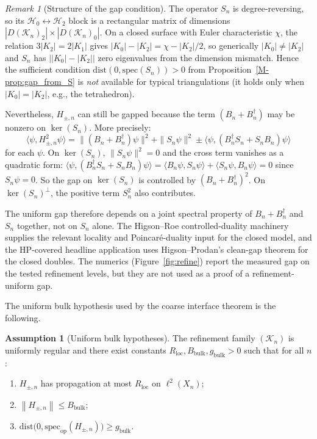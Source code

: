 \documentclass[11pt]{article}
\numberwithin{equation}{section}
\theoremstyle{definition}
\newtheorem{assumption}[theorem]{Assumption}
\theoremstyle{remark}
\newtheorem{remark}[theorem]{Remark}
\newcommand{\K}{\mathcal{K}}
\newcommand{\Hil}{\mathcal{H}}
\newcommand{\spec}{\mathrm{spec}}
\newcommand{\dist}{\mathrm{dist}}
\newcommand{\opnorm}[1]{\left\lVert#1\right\rVert}
\begin{document}
\begin{remark}[Structure of the gap condition]\label{rem:gap_structure}
The operator $S_n$ is degree-reversing, so its $\Hil_0\leftrightarrow\Hil_2$ block is a
rectangular matrix of dimensions $|D(\K_n)_2|\times|D(\K_n)_0|$. On a closed surface with Euler
characteristic $\chi$, the relation $3|K_2|=2|K_1|$ gives $|K_0|-|K_2|=\chi-|K_2|/2$, so
generically $|K_0|\neq|K_2|$ and $S_n$ has $\bigl||K_0|-|K_2|\bigr|$ zero eigenvalues from the
dimension mismatch. Hence the sufficient condition $\dist(0,\spec(S_n))>0$ from
Proposition~\ref{M-prop:gap_from_S} is \emph{not} available for typical triangulations (it holds only
when $|K_0|=|K_2|$, e.g., the tetrahedron).

Nevertheless, $H_{\pm,n}$ can still be gapped because the term $(B_n+B_n^\dagger)$ may be nonzero
on $\ker(S_n)$. More precisely:
\[
\langle\psi, H_{\pm,n}^2\psi\rangle
=
\|(B_n+B_n^\dagger)\psi\|^2+\|S_n\psi\|^2
\pm\langle\psi,(B_n^\dagger S_n+S_nB_n)\psi\rangle
\]
for each $\psi$. On $\ker(S_n)$, $\|S_n\psi\|^2=0$ and the cross term vanishes as a quadratic form:
$\langle\psi,(B_n^\dagger S_n+S_nB_n)\psi\rangle=\langle B_n\psi,S_n\psi\rangle+\langle
S_n\psi,B_n\psi\rangle=0$ since $S_n\psi=0$. So the gap on $\ker(S_n)$ is controlled by
$(B_n+B_n^\dagger)^2$. On $\ker(S_n)^\perp$, the positive term $S_n^2$ also contributes.

The uniform gap therefore depends on a joint spectral property of $B_n+B_n^\dagger$ and $S_n$
together, not on $S_n$ alone. The Higson--Roe controlled-duality machinery supplies the relevant
locality and Poincar\'e-duality input for the closed model, and the HP-covered headline application
uses Higson--Prodan's clean-gap theorem for the closed doubles. The numerics
(Figure~\ref{fig:refine}) report the measured gap on the tested refinement levels, but they are not
used as a proof of a refinement-uniform gap.
\end{remark}

The uniform bulk hypothesis used by the coarse interface theorem is the following.

\begin{assumption}[Uniform bulk hypotheses]\label{ass:uniform_bulk}
The refinement family $(\K_n)$ is uniformly regular and there exist constants
$R_{\mathrm{loc}},B_{\mathrm{bulk}},g_{\mathrm{bulk}}>0$ such that for all $n$:
\begin{enumerate}[label=(\alph*),leftmargin=2em]
\item $H_{\pm,n}$ has propagation at most $R_{\mathrm{loc}}$ on $\ell^2(X_n)$;
\item $\opnorm{H_{\pm,n}}\le B_{\mathrm{bulk}}$;
\item $\dist\bigl(0,\spec_{\mathrm{op}}(H_{\pm,n})\bigr)\ge g_{\mathrm{bulk}}$.
\end{enumerate}
\end{assumption}
\end{document}
